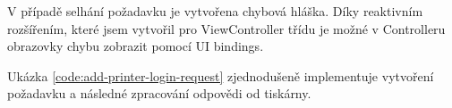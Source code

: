 V případě selhání požadavku je vytvořena chybová hláška.
Díky reaktivním rozšířením, které jsem vytvořil pro ViewController třídu je možné v Controlleru obrazovky chybu zobrazit pomocí UI bindings.

Ukázka \ref{code:add-printer-login-request} zjednodušeně implementuje vytvoření požadavku a následné zpracování odpovědi od tiskárny.


